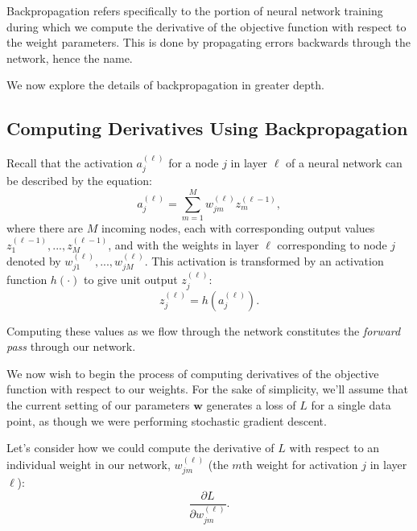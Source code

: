 Backpropagation refers specifically to the portion of neural network training during which we compute the derivative of the objective function with respect to the weight parameters. This is done by propagating errors backwards through the network, hence the name.


We now explore the details of backpropagation in greater depth.

\subsection{Computing Derivatives Using Backpropagation}

Recall that the activation $a_{j}^{(\ell)}$ for a  node $j$ in layer $\ell$ of a neural network can be described by the equation:
\begin{equation} \label{activations-reminder}
	a_{j}^{(\ell)} = \sum_{m=1}^{M} w^{(\ell)}_{jm} z^{(\ell-1)}_{m},
      \end{equation}
where there are $M$ incoming nodes, each with corresponding output values $z^{(\ell-1)}_{1}, ..., z^{(\ell-1)}_{M}$, and with the weights in layer $\ell$ corresponding to node $j$ denoted by $w^{(\ell)}_{j1}, ..., w^{(\ell)}_{jM}$.
This activation is transformed by an activation function $h(\cdot)$  to give unit output $z^{(\ell)}_{j}$:
\begin{equation} \label{transformed-activations-reminder}
	z^{(\ell)}_{j} = h(a^{(\ell)}_{j}).
\end{equation}

Computing these values as we flow through the network constitutes the {\em forward pass } through our network.

We now wish to begin the process of computing derivatives of the objective function with respect to our weights. For the sake of simplicity, we'll assume that the current setting of our parameters $\textbf{w}$ generates a loss of $L$ for a single data point, as though we were performing stochastic gradient descent.

Let's consider how we could compute the derivative of $L$ with respect to an individual weight in our network, $w^{(\ell)}_{jm}$ (the $m$th weight for activation $j$ in layer $\ell$):
%
\begin{equation} \label{deriv-E-wrt-wjm}
	\frac{\partial L}{\partial w^{(\ell)}_{jm}}.
\end{equation}

